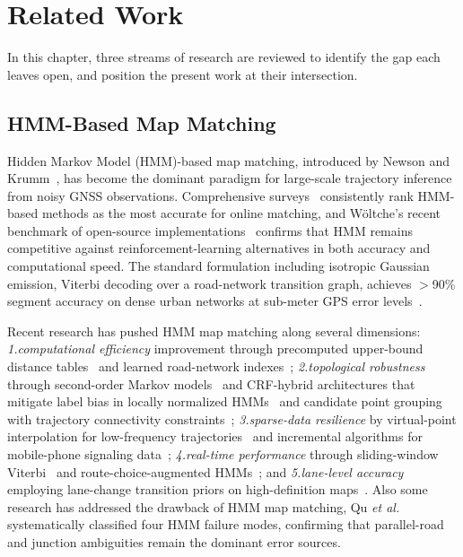 \documentclass[letterpaper,journal]{IEEEtran}
\begin{document}
\section{Related Work}
\label{sec:related_work}

In this chapter, three streams of research are reviewed to identify the gap each leaves open, and
position the present work at their intersection.

\subsection{HMM-Based Map Matching}

Hidden Markov Model (HMM)-based map matching, introduced by Newson and
Krumm~\cite{HMM}, has become the dominant paradigm for large-scale trajectory
inference from noisy GNSS observations. Comprehensive surveys~\cite{Quddus2007,
Hashemi2014, Hashemi2016, Chao2020, Singh2023} consistently rank HMM-based methods as the
most accurate for online matching, and W\"{o}ltche's recent benchmark of
open-source implementations~\cite{Woltche2023} confirms that HMM remains
competitive against reinforcement-learning alternatives in both accuracy and
computational speed. The standard formulation including isotropic Gaussian emission,
Viterbi decoding over a road-network transition graph, achieves
$>$90\% segment accuracy on dense urban networks at sub-meter GPS error
levels~\cite{FMM}.

Recent research has pushed HMM map matching along several dimensions:
\textit{1.computational efficiency} improvement through precomputed upper-bound
distance tables~\cite{FMM} and learned road-network indexes~\cite{Liu2025_LiMM};
\textit{2.topological robustness} through second-order Markov
models~\cite{Fu2021} and CRF-hybrid architectures that mitigate
label bias in locally normalized HMMs~\cite{Li2024_IJDE} and candidate point
grouping with trajectory connectivity constraints~\cite{Li2023};
\textit{3.sparse-data resilience} by virtual-point interpolation for
low-frequency trajectories~\cite{Wang2024} and incremental algorithms for
mobile-phone signaling data~\cite{Huang2024};
\textit{4.real-time performance} through sliding-window
Viterbi~\cite{Goh2012} and route-choice-augmented HMMs~\cite{Jagadeesh2017,Taguchi2019};
and \textit{5.lane-level
accuracy} employing lane-change transition priors on high-definition
maps~\cite{Hansson2021}. Also some research has addressed the drawback of HMM map matching, 
Qu \emph{et al.}~\cite{Qu2023} systematically
classified four HMM failure modes, confirming that parallel-road and
junction ambiguities remain the dominant error sources. 
\end{document}
